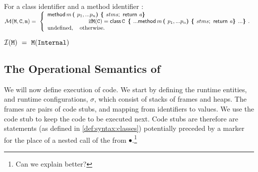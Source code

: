   
 \begin{definition}[Lookup] For a class identifier   and a method identifier  : $ ~ $ \\

\noindent
$
\Meths {} {\prg{C}} {m}      =  \ \left\{  
\begin{array}{l}
                          \kw{method}\, m\, \lp p_1, ... p_n \rp \lb stms \semi\, \kw{return}\ {\syntax{a}} \rb\\
\hspace{1in} \mbox{if}  \M(\prg{C}) =   
\kw{class}\, \prg{C}\, \  \lb ...   \kw{method}\, m\, \lp p_1, ... p_n \rp \lb stms \semi\, \kw{return}\ {\syntax{a}} \rb  ... \rb.  
\\
\mbox{undefined},  \ \ \ \mbox{otherwise.}
\end{array}
                    \right.$
 
${\mathcal{ I}} ( {\M} ) \    =  \     \M(\prg{Internal} )$
  \end{definition}

\subsection{The Operational Semantics of \LangOO}
\label{formal:semantics}

We will now define execution of \LangOO code. We start by  defining the  runtime entities, and runtime configurations, $\sigma$, which consist of stacks of frames and heaps. The frames are pairs of code stubs, and mapping from identifiers to values. We use the code stub to keep the code to be executed next. Code stubs are therefore are statements (as defined in \ref{def:syntax:classes}) potentially preceded by a marker for the place of a nested call of the from \x {\kw{:=}} $\bullet$.\footnote{Can we explain better?} 

